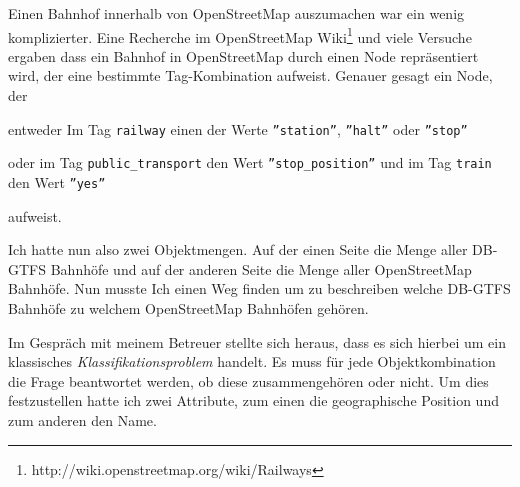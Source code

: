 Einen Bahnhof innerhalb von OpenStreetMap auszumachen war ein wenig komplizierter.
Eine Recherche im OpenStreetMap Wiki\footnote{http://wiki.openstreetmap.org/wiki/Railways} und viele Versuche ergaben dass ein Bahnhof in OpenStreetMap durch einen Node repräsentiert wird, der eine bestimmte Tag-Kombination aufweist.
Genauer gesagt ein Node, der
\begin{compactitem}
  \item entweder Im Tag \texttt{railway} einen der Werte \texttt{''station''}, \texttt{''halt''} oder \texttt{''stop''}
  \item oder im Tag \texttt{public\_transport} den Wert \texttt{''stop\_position''} und im Tag \texttt{train} den Wert \texttt{''yes''}
\end{compactitem}
aufweist.

Ich hatte nun also zwei Objektmengen.
Auf der einen Seite die Menge aller DB-GTFS Bahnhöfe und auf der anderen Seite die Menge aller OpenStreetMap Bahnhöfe.
Nun musste Ich einen Weg finden um zu beschreiben welche DB-GTFS Bahnhöfe zu welchem OpenStreetMap Bahnhöfen gehören.

Im Gespräch mit meinem Betreuer stellte sich heraus, dass es sich hierbei um ein klassisches \textit{Klassifikationsproblem} handelt.
Es muss für jede Objektkombination die Frage beantwortet werden, ob diese zusammengehören oder nicht.
Um dies festzustellen hatte ich zwei Attribute, zum einen die geographische Position und zum anderen den Name.

